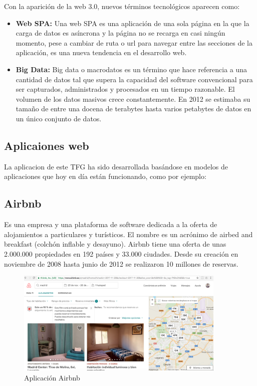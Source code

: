 Con la aparición de la web 3.0, nuevos términos tecnológicos aparecen como:
\begin{itemize}
     \item \textbf{Web SPA: }Una web SPA es una aplicación de una sola página en la que la carga de datos es asíncrona y la página no se recarga en casi ningún momento, pese a cambiar de ruta o url para navegar entre las secciones de la aplicación, es una nueva tendencia en el desarrollo web.
     \item \textbf{Big Data: } Big data o macrodatos es un término que hace referencia a una cantidad de datos tal que supera la capacidad del software convencional para ser capturados, administrados y procesados en un tiempo razonable. El volumen de los datos masivos crece constantemente. En 2012 se estimaba su tamaño de entre una docena de terabytes hasta varios petabytes de datos en un único conjunto de datos.

\end{itemize}


\subsection*{Aplicaiones web}

La aplicacion de este TFG ha sido desarrollada basándose en modelos de aplicaciones que hoy en día están funcionando, como por ejemplo:

\subsection{Airbnb}

Es una empresa y una plataforma de software dedicada a la oferta de alojamientos a particulares y turísticos. El nombre es un acrónimo de airbed and breakfast (colchón inflable y desayuno). Airbnb tiene una oferta de unas 2.000.000 propiedades en 192 países y 33.000 ciudades. Desde su creación en noviembre de 2008 hasta junio de 2012 se realizaron 10 millones de reservas.

\begin{figure}[H]
    \centering
    \includegraphics[width=100mm]{memoria/LaTeX/img/introduccion/airbnb.png}
    \caption{Aplicación Airbnb}
\end{figure}

